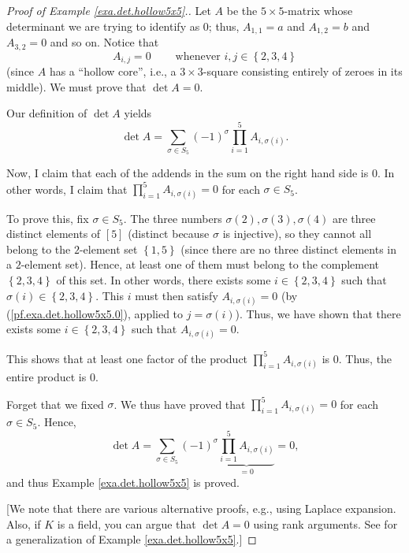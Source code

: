 \begin{proof}
[Proof of Example \ref{exa.det.hollow5x5}.]Let $A$ be the $5\times5$-matrix
whose determinant we are trying to identify as $0$; thus, $A_{1,1}=a$ and
$A_{1,2}=b$ and $A_{3,2}=0$ and so on. Notice that%
\begin{equation}
A_{i,j}=0\ \ \ \ \ \ \ \ \ \ \text{whenever }i,j\in\left\{  2,3,4\right\}
\label{pf.exa.det.hollow5x5.0}%
\end{equation}
(since $A$ has a \textquotedblleft hollow core\textquotedblright, i.e., a
$3\times3$-square consisting entirely of zeroes in its middle). We must prove
that $\det A=0$.

Our definition of $\det A$ yields%
\begin{equation}
\det A=\sum_{\sigma\in S_{5}}\left(  -1\right)  ^{\sigma}\prod\limits_{i=1}%
^{5}A_{i,\sigma\left(  i\right)  }. \label{pf.exa.det.hollow5x5.detA=}%
\end{equation}


Now, I claim that each of the addends in the sum on the right hand side is
$0$. In other words, I claim that $\prod\limits_{i=1}^{5}A_{i,\sigma\left(
i\right)  }=0$ for each $\sigma\in S_{5}$.

To prove this, fix $\sigma\in S_{5}$. The three numbers $\sigma\left(
2\right)  ,\sigma\left(  3\right)  ,\sigma\left(  4\right)  $ are three
distinct elements of $\left[  5\right]  $ (distinct because $\sigma$ is
injective), so they cannot all belong to the $2$-element set $\left\{
1,5\right\}  $ (since there are no three distinct elements in a $2$-element
set). Hence, at least one of them must belong to the complement $\left\{
2,3,4\right\}  $ of this set. In other words, there exists some $i\in\left\{
2,3,4\right\}  $ such that $\sigma\left(  i\right)  \in\left\{  2,3,4\right\}
$. This $i$ must then satisfy $A_{i,\sigma\left(  i\right)  }=0$ (by
(\ref{pf.exa.det.hollow5x5.0}), applied to $j=\sigma\left(  i\right)  $).
Thus, we have shown that there exists some $i\in\left\{  2,3,4\right\}  $ such
that $A_{i,\sigma\left(  i\right)  }=0$.

This shows that at least one factor of the product $\prod\limits_{i=1}%
^{5}A_{i,\sigma\left(  i\right)  }$ is $0$. Thus, the entire product is $0$.

Forget that we fixed $\sigma$. We thus have proved that $\prod\limits_{i=1}%
^{5}A_{i,\sigma\left(  i\right)  }=0$ for each $\sigma\in S_{5}$. Hence,%
\[
\det A=\sum_{\sigma\in S_{5}}\left(  -1\right)  ^{\sigma}\underbrace{\prod
\limits_{i=1}^{5}A_{i,\sigma\left(  i\right)  }}_{=0}=0,
\]
and thus Example \ref{exa.det.hollow5x5} is proved.

[We note that there are various alternative proofs, e.g., using Laplace
expansion. Also, if $K$ is a field, you can argue that $\det A=0$ using rank
arguments. See \cite[Exercise 6.47 \textbf{(a)}]{detnotes} for a
generalization of Example \ref{exa.det.hollow5x5}.]
\end{proof}


